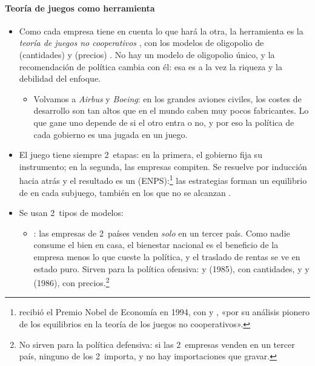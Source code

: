 \documentclass[11pt]{article}
\begin{document}
\paragraph{Teoría de juegos como herramienta}

\begin{itemize}
\item Como cada empresa tiene en cuenta lo que hará la otra, la herramienta es la \emph{teoría de juegos no cooperativos} , con los modelos de oligopolio de  (cantidades) y  (precios) . No hay un modelo de oligopolio único, y la recomendación de política cambia con él: esa es a la vez la riqueza y la debilidad del enfoque.
  \begin{itemize}
  \item Volvamos a \emph{Airbus} y \emph{Boeing}: en los grandes aviones civiles, los costes de desarrollo son tan altos que en el mundo caben muy pocos fabricantes. Lo que gane uno depende de si el otro entra o no, y por eso la política de cada gobierno es una jugada en un juego.
  \end{itemize}
\item El juego tiene siempre 2~etapas: en la primera, el gobierno fija su instrumento; en la segunda, las empresas compiten. Se resuelve por inducción hacia atrás y el resultado es un  (ENPS):\footnote{ recibió el Premio Nobel de Economía en 1994, con  y , «por su análisis pionero de los equilibrios en la teoría de los juegos no cooperativos»\nocite{Nobel1994Nash}.} las estrategias forman un equilibrio de  en cada subjuego, también en los que no se alcanzan .
\item Se usan 2~tipos de modelos:
  \begin{itemize}
  \item {}: las empresas de 2~países venden \emph{solo} en un tercer país. Como nadie consume el bien en casa, el bienestar nacional es el beneficio de la empresa menos lo que cueste la política, y el traslado de rentas se ve en estado puro. Sirven para la política ofensiva:  y  (1985), con cantidades, y  y  (1986), con precios.\footnote{No sirven para la política defensiva: si las 2~empresas venden en un tercer país, ninguno de los 2~importa, y no hay importaciones que gravar.}

\end{itemize}
\end{itemize}
\end{document}
